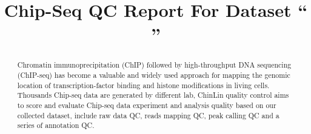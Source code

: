 \documentclass{\VAR{bmcard}} %
\begin{document}
\begin{frontmatter}

\begin{fmbox}
\title{Chip-Seq QC Report For Dataset ``  ''}

\author[
   email={xsliu.dfci@gmail.com}   %
]{}



\end{fmbox}%
\begin{abstractbox}

\begin{abstract} %
Chromatin immunoprecipitation (ChIP) followed by high-throughput DNA sequencing (ChIP-seq) has become a valuable and widely used approach for mapping the genomic location of transcription-factor binding and histone modifications in living cells. Thousands Chip-seq data are generated by different lab, ChinLin quality control aims to  score and evaluate Chip-seq data experiment and analysis quality based on our collected dataset, include raw data QC, reads mapping QC, peak calling QC and a series of annotation QC.
\end{abstract}
\end{abstractbox}
\end{frontmatter}
\end{document}
